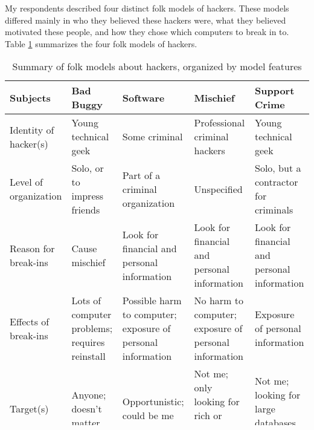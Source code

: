 \documentclass{ledger}
\begin{document}
My respondents described four distinct folk models of hackers. These models differed mainly in who they believed these hackers were, what they believed motivated these people, and how they chose which computers to break in to. Table \ref{table2:data} summarizes the four folk models of hackers.\\
\begin{table}[H]
\centering
\begin{tabular}{p{2cm}|p{2cm}|p{2cm}|p{2cm}|p{2cm}}
     \hline
    Subjects  & Bad Buggy & Software & Mischief & Support Crime \\
     \hline
    Identity of hacker(s) & Young technical geek & Some criminal & Professional criminal hackers &
Young technical geek \\
     \hline
     Level of organization &Solo, or to impress friends & Part of a criminal organization & Unspecified & Solo, but a contractor for criminals \\
     \hline
     Reason for break-ins &Cause mischief & Look for financial and personal information & Look for financial and personal information & Look for financial and personal information \\
     \hline
Effects of break-ins & Lots of computer problems; requires reinstall & Possible harm to computer; exposure of personal information  & No harm to computer; exposure of personal information & Exposure of personal information \\
    \hline
    Target(s) & Anyone; doesn’t matter &Opportunistic; could be me & Not me; only looking for rich or important people & Not me; looking for large databases of info \\
     \hline
     Am I a target?  &Possibly &Possibly & No & No \\
      \hline
\end{tabular}
\caption{Summary of folk models about hackers, organized by model features }
\label{table2:data}
\end{table}
    
\end{document}
